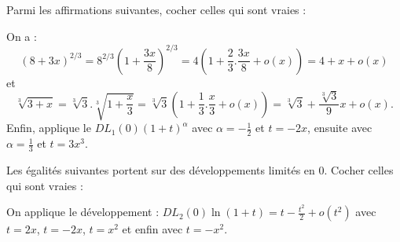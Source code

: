 \begin{question}
Parmi les affirmations suivantes, cocher celles qui sont vraies :
\begin{answers}
\end{answers}
\begin{explanations}
On a :
$$(8+3x)^{2/3}=8^{2/3}\left(1+\frac{3x}{8}\right)^{2/3}=4\left(1+\frac{2}{3}.\frac{3x}{8}+o(x)\right)=4+x+o(x)$$
et
$$\sqrt[3]{3+x}=\sqrt[3]{3}.\sqrt[3]{1+\frac{x}{3}}=\sqrt[3]{3}\left(1+\frac{1}{3}.\frac{x}{3}+o(x)\right)=\sqrt[3]{3}+\frac{\sqrt[3]{3}}{9}x+o(x).$$
Enfin, applique le $\displaystyle DL_1(0)(1+t)^{\alpha}$ avec $\displaystyle \alpha =-\frac{1}{2}$ et $t=-2x$, ensuite avec $\displaystyle \alpha =\frac{1}{3}$ et $t=3x^3$.
\end{explanations}
\end{question}

\begin{question}
Les égalités suivantes portent sur des développements limités en $0$. Cocher celles qui sont vraies :
\begin{answers}  
\end{answers}
\begin{explanations}
On applique le développement : $\displaystyle DL_2(0)\ln(1+t)=t-\frac{t^2}{2}+o(t^2)$ avec $t=2x$, $t=-2x$, $t=x^2$ et enfin avec $t=-x^2$.
\end{explanations}
\end{question}


